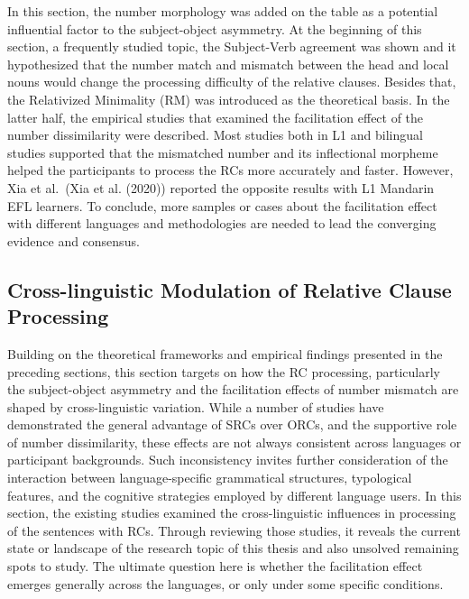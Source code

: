 \documentclass[
]{article}
\begin{document}
In this section, the number morphology was added on the table as a
potential influential factor to the subject-object asymmetry. At the
beginning of this section, a frequently studied topic, the Subject-Verb
agreement was shown and it hypothesized that the number match and
mismatch between the head and local nouns would change the processing
difficulty of the relative clauses. Besides that, the Relativized
Minimality (RM) was introduced as the theoretical basis. In the latter
half, the empirical studies that examined the facilitation effect of the
number dissimilarity were described. Most studies both in L1 and
bilingual studies supported that the mismatched number and its
inflectional morpheme helped the participants to process the RCs more
accurately and faster. However, Xia et al.~(Xia et al. (2020)) reported
the opposite results with L1 Mandarin EFL learners. To conclude, more
samples or cases about the facilitation effect with different languages
and methodologies are needed to lead the converging evidence and
consensus.

\subsection{Cross-linguistic Modulation of Relative Clause
Processing}\label{cross-linguistic-modulation-of-relative-clause-processing}

Building on the theoretical frameworks and empirical findings presented
in the preceding sections, this section targets on how the RC
processing, particularly the subject-object asymmetry and the
facilitation effects of number mismatch are shaped by cross-linguistic
variation. While a number of studies have demonstrated the general
advantage of SRCs over ORCs, and the supportive role of number
dissimilarity, these effects are not always consistent across languages
or participant backgrounds. Such inconsistency invites further
consideration of the interaction between language-specific grammatical
structures, typological features, and the cognitive strategies employed
by different language users. In this section, the existing studies
examined the cross-linguistic influences in processing of the sentences
with RCs. Through reviewing those studies, it reveals the current state
or landscape of the research topic of this thesis and also unsolved
remaining spots to study. The ultimate question here is whether the
facilitation effect emerges generally across the languages, or only
under some specific conditions.
\end{document}
